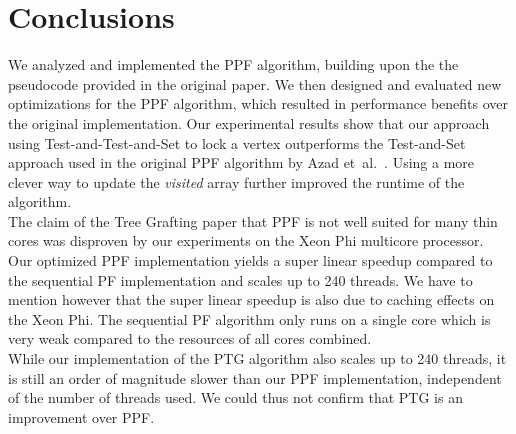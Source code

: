 \documentclass[letterpaper]{article}
\begin{document}
\section{Conclusions}

We analyzed and implemented the PPF algorithm, building upon the the pseudocode provided in the original paper. We then designed and evaluated new optimizations for the PPF algorithm, which resulted in performance benefits over the original implementation. Our experimental results show that our approach using Test-and-Test-and-Set to lock a vertex outperforms the  Test-and-Set approach used in the original PPF algorithm by Azad et\ al.\ \cite{Azad:2012}. Using a more clever way to update the \textit{visited} array further improved the runtime of the algorithm.\\

The claim of the Tree Grafting paper \cite{Azad:2015} that PPF is not well suited for many thin cores was disproven by our experiments on the Xeon Phi multicore processor. Our optimized PPF implementation yields a super linear speedup compared to the sequential PF implementation and scales up to 240 threads. We have to mention however that the super linear speedup is also due to caching effects on the Xeon Phi. The sequential PF algorithm only runs on a single core which is very weak compared to the resources of all cores combined.\\

While our implementation of the PTG algorithm also scales up to 240 threads, it is still an order of magnitude slower than our PPF implementation, independent of the number of threads used. We could thus not confirm that PTG is an improvement over PPF.
\end{document}
